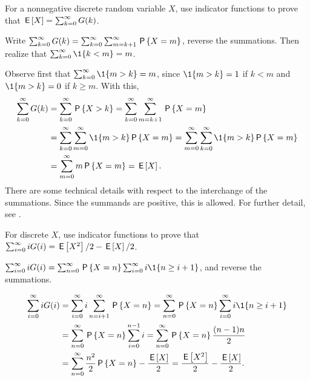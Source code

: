 \documentclass[queueing-book]{subfiles}
\begin{document}
\begin{exercise}\label{ex:6}
 For a nonnegative discrete random variable $X$, use indicator functions to prove that $\E X = \sum_{k=0}^\infty G(k)$.
\begin{hint}
Write
$\sum_{k=0}^\infty G(k) = \sum_{k=0}^\infty \sum_{m=k+1}^\infty \P{X=m}$, reverse the summations. Then realize that $\sum_{k=0}^\infty \1{k<m} = m$.
\end{hint}
\begin{solution}
Observe first that $\sum_{k=0}^\infty \1{m>k} = m$, since $\1{m>k}=1$ if $k<m$ and $\1{m>k} = 0$ if $k\geq m$. With this,
\begin{align*}
\sum_{k=0}^\infty G(k)
&= \sum_{k=0}^\infty \P{X>k}
= \sum_{k=0}^\infty \sum_{m=k+1}^\infty \P{X=m} \\
& = \sum_{k=0}^\infty \sum_{m=0}^\infty \1{m>k} \P{X=m}
= \sum_{m=0}^\infty \sum_{k=0}^\infty \1{m>k} \P{X=m} \\
&= \sum_{m=0}^\infty m\P{X=m} = \E X.
\end{align*}
There are some technical details with respect to the interchange of the summations.
Since the summands are positive, this is allowed.
For further detail, see \citet{capinski03:_probab_probl}.
\end{solution}
\end{exercise}

\begin{exercise}\label{ex:66}
For discrete $X$,  use indicator functions to prove that
$\sum_{i=0}^\infty i G(i) = \E{X^2}/2 - \E{X}/2$.
\begin{hint}
$\sum_{i=0}^\infty i G(i) = \sum_{n=0}^\infty \P{X=n} \sum_{i=0}^\infty i \1{n\geq i+1}$,
and reverse the summations.
\end{hint}
\begin{solution}
\begin{align*}
\sum_{i=0}^\infty i G(i)
&= \sum_{i=0}^\infty i \sum_{n=i+1}^\infty \P{X=n} = \sum_{n=0}^\infty \P{X=n} \sum_{i=0}^\infty i \1{n\geq i+1} \\
&= \sum_{n=0}^\infty \P{X=n} \sum_{i=0}^{n-1}i = \sum_{n=0}^\infty \P{X=n} \frac{(n-1)n}{2} \\
&= \sum_{n=0}^\infty \frac{n^2}{2} \P{X=n} - \frac{\E X}{2}
= \frac{\E{X^2}}{2} - \frac{\E X}{2}.
\end{align*}
\end{solution}
\end{exercise}
\end{document}
